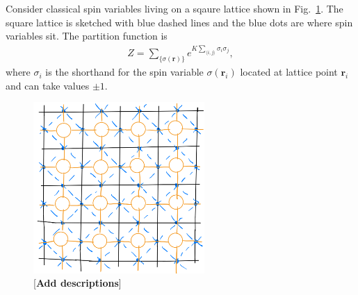 \documentclass[aps,prb,reprint,superscriptaddress]{revtex4-2}
\begin{document}
Consider classical spin variables living on a sqaure lattice shown in
Fig.~\ref{fig:spin2tensor}. The square lattice is sketched with blue
dashed lines and the blue dots are where spin variables sit. The
partition function is
%
\begin{align}\label{eq:2DIsingZ}
    Z = \sum_{\{\sigma(\mathbf{r})\}}e^{K\sum_{\langle i,j
        \rangle}\sigma_i \sigma_j},
\end{align}
where $\sigma_i$ is the shorthand for the spin variable
$\sigma(\mathbf{r}_i)$ located at lattice point $\mathbf{r}_i$ and can
take values $\pm 1$. 
\begin{figure}[h]
    \includegraphics[width=6.5cm]{./figs/spin2tensor}
    \caption{\label{fig:spin2tensor}[\textbf{Add descriptions}]}
\end{figure}
%
\end{document}
